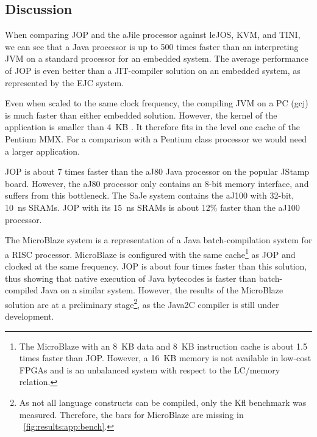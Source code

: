 

\subsection{Discussion}
\label{sec:perf:disc}

When comparing JOP and the aJile processor against leJOS, KVM, and
TINI, we can see that a Java processor is up to 500 times faster
than an interpreting JVM on a standard processor for an embedded
system. The average performance of JOP is even better than a
JIT-compiler solution on an embedded system, as represented by the
EJC system.

Even when scaled to the same clock frequency, the compiling JVM on a
PC (gcj) is much faster than either embedded solution. However, the
kernel of the application is smaller than 4~KB
\cite{jop:jtres_cache}. It therefore fits in the level one cache of
the Pentium MMX. For a comparison with a Pentium class processor we
would need a larger application.

JOP is about 7 times faster than the aJ80 Java processor on the
popular JStamp board. However, the aJ80 processor only contains an
8-bit memory interface, and suffers from this bottleneck. The SaJe
system contains the aJ100 with 32-bit, 10~ns SRAMs. JOP with its
15~ns SRAMs is about 12\% faster than the aJ100 processor.

The MicroBlaze system is a representation of a Java batch-compilation
system for a RISC processor. MicroBlaze is configured with the same
cache\footnote{The MicroBlaze with an 8~KB data and 8~KB instruction
cache is about 1.5 times faster than JOP. However, a 16~KB memory is
not available in low-cost FPGAs and is an unbalanced system with
respect to the LC/memory relation.} as JOP and clocked at the same
frequency. JOP is about four times faster than this solution, thus
showing that native execution of Java bytecodes is faster than
batch-compiled Java on a similar system. However, the results of the
MicroBlaze solution are at a preliminary stage\footnote{As not all
language constructs can be compiled, only the Kfl benchmark was
measured. Therefore, the bars for MicroBlaze are missing in
\figurename~\ref{fig:results:app:bench}.}, as the Java2C compiler
\cite{Java2C} is still under development.

